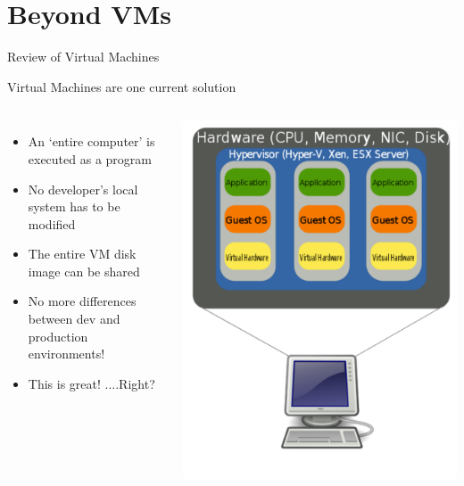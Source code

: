 \documentclass[xcolor=dvipsnames]{beamer}
\begin{document}
\section{Beyond VMs}
\begin{frame}{Review of Virtual Machines}
  
  Virtual Machines are one current solution

  \begin{columns}
  \begin{itemize}
    \item An `entire computer' is executed as a program
    \item No developer's local system has to be modified
    \item The entire VM disk image can be shared  
    \item No more differences between dev and production environments!
    \item This is great! ....Right?
  \end{itemize}

  \includegraphics[width=\textwidth]{figures/virtualization.pdf}
  \end{columns}

\end{frame}
\end{document}
